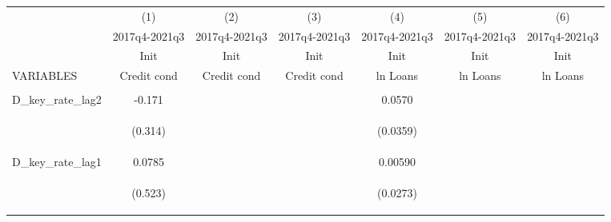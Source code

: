 \documentclass[]{article}
\begin{document}
\begin{center}
\begin{tabular}{lcccccc} \hline
 & (1) & (2) & (3) & (4) & (5) & (6) \\
 & 2017q4-2021q3 & 2017q4-2021q3 & 2017q4-2021q3 & 2017q4-2021q3 & 2017q4-2021q3 & 2017q4-2021q3 \\
 & Init & Init & Init & Init & Init & Init \\
VARIABLES & Credit cond & Credit cond & Credit cond & ln Loans & ln Loans & ln Loans \\ \hline
\vspace{4pt} & \begin{footnotesize}\end{footnotesize} & \begin{footnotesize}\end{footnotesize} & \begin{footnotesize}\end{footnotesize} & \begin{footnotesize}\end{footnotesize} & \begin{footnotesize}\end{footnotesize} & \begin{footnotesize}\end{footnotesize} \\
D\_key\_rate\_lag2 & -0.171 &  &  & 0.0570 &  &  \\
\vspace{4pt} & \begin{footnotesize}(0.314)\end{footnotesize} & \begin{footnotesize}\end{footnotesize} & \begin{footnotesize}\end{footnotesize} & \begin{footnotesize}(0.0359)\end{footnotesize} & \begin{footnotesize}\end{footnotesize} & \begin{footnotesize}\end{footnotesize} \\
D\_key\_rate\_lag1 & 0.0785 &  &  & 0.00590 &  &  \\
\vspace{4pt} & \begin{footnotesize}(0.523)\end{footnotesize} & \begin{footnotesize}\end{footnotesize} & \begin{footnotesize}\end{footnotesize} & \begin{footnotesize}(0.0273)\end{footnotesize} & \begin{footnotesize}\end{footnotesize} & \begin{footnotesize}\end{footnotesize} \\

\end{tabular}
\end{center}
\end{document}

